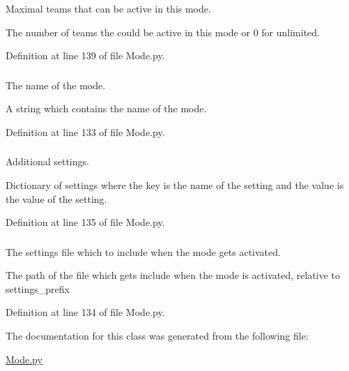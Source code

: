 Maximal teams that can be active in this mode. 

The number of teams the could be active in this mode or 0 for unlimited. 

Definition at line 139 of file Mode.py.

\hypertarget{class_mode_1_1_mode_a38afa93ee0f4ad9e8258a510ccdbaa9c}{
\subsubsection[{name}]{}}
\label{class_mode_1_1_mode_a38afa93ee0f4ad9e8258a510ccdbaa9c}


The name of the mode. 

A string which contains the name of the mode. 

Definition at line 133 of file Mode.py.

\hypertarget{class_mode_1_1_mode_af4bebfeddda24f7437fc086bc52ca711}{
\subsubsection[{settings}]{}}
\label{class_mode_1_1_mode_af4bebfeddda24f7437fc086bc52ca711}


Additional settings. 

Dictionary of settings where the key is the name of the setting and the value is the value of the setting. 

Definition at line 135 of file Mode.py.

\hypertarget{class_mode_1_1_mode_a40402dcfd634686dcd9b2ce8b8f3d4eb}{
\subsubsection[{settings\_\-file}]{}}
\label{class_mode_1_1_mode_a40402dcfd634686dcd9b2ce8b8f3d4eb}


The settings file which to include when the mode gets activated. 

The path of the file which gets include when the mode is activated, relative to settings\_\-prefix 

Definition at line 134 of file Mode.py.



The documentation for this class was generated from the following file:\begin{DoxyCompactItemize}
\item 
\hyperlink{_mode_8py}{Mode.py}\end{DoxyCompactItemize}
